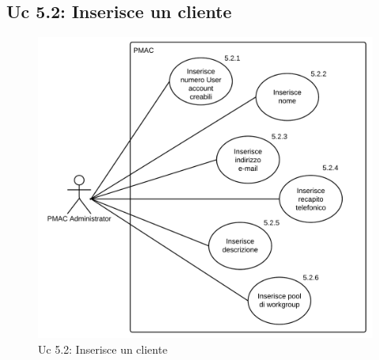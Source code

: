 \documentclass[10pt,a4paper]{article}
\begin{document}

\subsection{Uc 5.2: Inserisce un cliente}
\begin{figure}[ht]
\centering
\caption{Uc 5.2: Inserisce un cliente}
\includegraphics[scale=0.9]{UseCase/Uc5_2} %
\end{figure}
\end{document}
